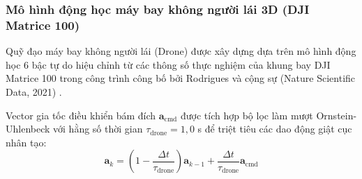 \subsubsection{Mô hình động học máy bay không người lái 3D (DJI Matrice 100)}

\hspace{0.5cm} Quỹ đạo máy bay không người lái (Drone) được xây dựng dựa trên mô hình động học 6 bậc tự do hiệu chỉnh từ các thông số thực nghiệm của khung bay DJI Matrice 100 trong công trình công bố bởi Rodrigues và cộng sự (Nature Scientific Data, 2021) \cite{rodrigues2021dji}.

\begin{table}[H]
\centering
\caption{Giới hạn động học khung bay không người lái DJI Matrice 100 trong mô phỏng}
\label{tab:drone-kinematic-limits}
\end{table}

Vector gia tốc điều khiển bám đích $\mathbf{a}_{\text{cmd}}$ được tích hợp bộ lọc làm mượt Ornstein-Uhlenbeck với hằng số thời gian $\tau_{\text{drone}} = 1{,}0$ s để triệt tiêu các dao động giật cục nhân tạo:
\begin{equation}
\mathbf{a}_k = \left( 1 - \frac{\Delta t}{\tau_{\text{drone}}} \right) \mathbf{a}_{k-1} + \frac{\Delta t}{\tau_{\text{drone}}} \mathbf{a}_{\text{cmd}}
\label{eq:drone-acceleration-ou-smoothing}
\end{equation}

